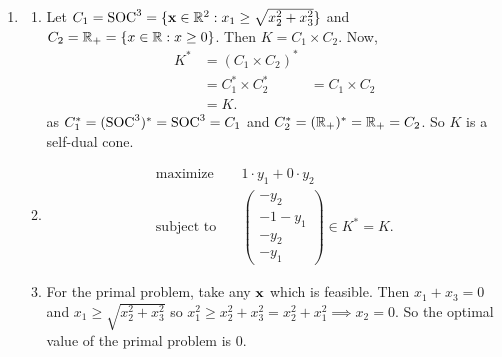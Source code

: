 \begin{enumerate}
\begin{enumerate}[label=(\arabic*)]
          \end{enumerate}
    \item \begin{enumerate}[label=(\arabic*)]
              \item Let \(C_1 = \operatorname{SOC}^3 = \{ \mathbf{x} \in \mathbb{R}^2: x_1 \geq \sqrt{x_2^2 + x_3^2} \}\) and \(C_2 = \mathbb{R}_+ = \{x \in \mathbb{R} : x \geq 0\}\). Then \(K = C_1 \times C_2\). Now,
                    \begin{align*}
                        K^* & = (C_1 \times C_2)^* \\
                            & = C_1^* \times C_2^*
                            & = C_1 \times C_2     \\
                            & = K.
                    \end{align*}
                    as \(C_1^* = (\operatorname{SOC}^3)^* = \operatorname{SOC}^3 = C_1\) and \(C_2^* = (\mathbb{R}_+)^* = \mathbb{R}_+ = C_2\). So \(K\) is a self-dual cone.
              \item    \begin{align*}
                        \text{maximize} \quad   & 1 \cdot y_1 + 0 \cdot y_2               \\
                        \text{subject to} \quad & \begin{pmatrix}
                            -y_2 \\ -1 - y_1 \\ -y_2 \\ -y_1
                        \end{pmatrix} \in K^* = K.
                    \end{align*}
              \item For the primal problem, take any \(\mathbf{x}\) which is feasible. Then \(x_1 + x_3 = 0\) and \(x_1 \geq \sqrt{x_2^2 + x_3^2}\) so \(x_1^2 \geq x_2^2 + x_3^2 = x_2^2 + x_1^2 \implies x_2 = 0\). So the optimal value of the primal problem is 0. \\


\end{enumerate}
\end{enumerate}
